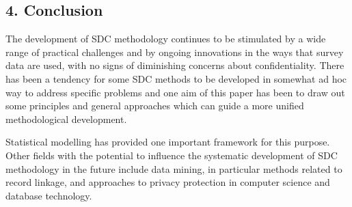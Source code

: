 \subsection{4. Conclusion}
The development of SDC methodology continues to be stimulated by a wide range of
practical challenges and by ongoing innovations in the ways that survey data are used,
with no signs of diminishing concerns about confidentiality. There has been a tendency
for some SDC methods to be developed in somewhat ad hoc way to address speciﬁc
problems and one aim of this paper has been to draw out some principles and general
approaches which can guide a more unified methodological development. 

Statistical modelling has provided one important framework for this purpose. Other fields with the
potential to inﬂuence the systematic development of SDC methodology in the future
include data mining, in particular methods related to record linkage, and approaches to
privacy protection in computer science and database technology.



